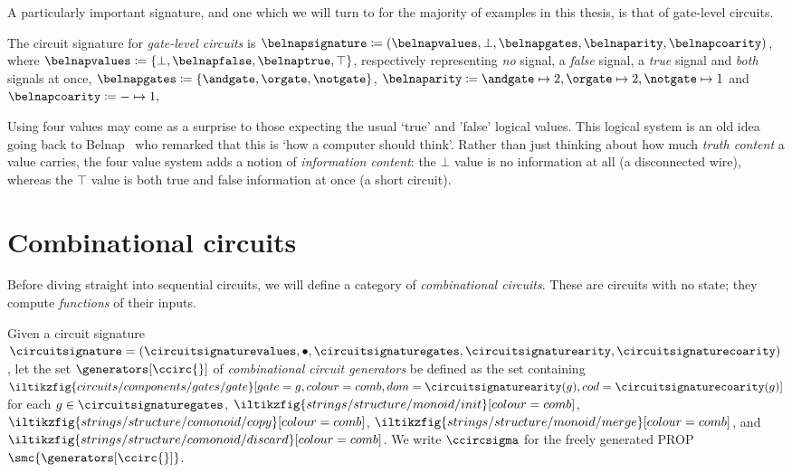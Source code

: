 \documentclass{lmcs}
\begin{document}
A particularly important signature, and one which we will turn to for the
majority of examples in this thesis, is that of gate-level circuits.

\begin{exa}\label{ex:belnap-signature}
    The circuit signature for \emph{gate-level circuits} is \(
    \belnapsignature \coloneqq (
    \belnapvalues,
    \bot,
    \belnapgates,
    \belnaparity,
    \belnapcoarity
    )\), where \(
    \belnapvalues \coloneqq \{\bot, \belnapfalse, \belnaptrue, \top\}
    \), respectively representing \emph{no} signal, a \emph{false} signal, a
    \emph{true} signal and \emph{both} signals at once, \(
    \belnapgates \coloneqq \{\andgate,\orgate,\notgate\}
    \), \(
    \belnaparity \coloneqq
    \andgate \mapsto 2,
    \orgate \mapsto 2,
    \notgate \mapsto 1
    \) and \(
    \belnapcoarity \coloneqq - \mapsto 1,
    \)
\end{exa}

\begin{rem}
    Using four values may come as a surprise to those expecting the usual
    `true' and 'false' logical values.
    This logical system is an old idea going back to
    Belnap~\cite{belnap1977useful} who remarked that this is `how a computer
    should think'.
    Rather than just thinking about how much \emph{truth content} a value
    carries, the four value system adds a notion of \emph{information content}:
    the \(\bot\) value is no information at all (a disconnected wire), whereas
    the \(\top\) value is both true and false information at once
    (a short circuit).
\end{rem}

\section{Combinational circuits}

Before diving straight into sequential circuits, we will define a category of
\emph{combinational circuits}.
These are circuits with no state; they compute \emph{functions} of their inputs.

\begin{defi}
    Given a circuit signature \(
    \circuitsignature = (
    \circuitsignaturevalues,
    \bullet,
    \circuitsignaturegates,
    \circuitsignaturearity,
    \circuitsignaturecoarity
    )
    \), let the set \(\generators[\ccirc{}]\) of
    \emph{combinational circuit generators} be defined as the set containing \(
    \iltikzfig{circuits/components/gates/gate}[gate=g,colour=comb,dom=\circuitsignaturearity(g),cod=\circuitsignaturecoarity(g)]
    \) for each \(g \in \circuitsignaturegates\),
    \(\iltikzfig{strings/structure/monoid/init}[colour=comb]\),
    \(\iltikzfig{strings/structure/comonoid/copy}[colour=comb]\),
    \(\iltikzfig{strings/structure/monoid/merge}[colour=comb]\), and
    \(\iltikzfig{strings/structure/comonoid/discard}[colour=comb]\).
    We write \(\ccircsigma\) for the freely generated PROP
    \(\smc{\generators[\ccirc{}]}\).
\end{defi}
\end{document}
